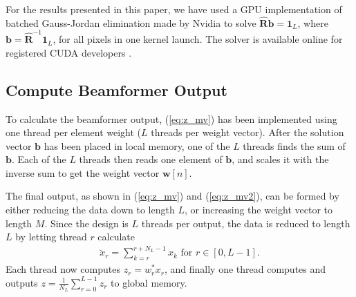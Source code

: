 \documentclass[journal]{IEEEtran}
\newcommand{\mat}[1]{\mathbf{#1}}
\renewcommand{\vec}[1]{\mathbf{#1}}
\begin{document}
For the results presented in this paper, we have used a GPU implementation of batched Gauss-Jordan elimination made by Nvidia to solve $\mat{\hat{R}}\vec{b} = \vec{1}_L$, where $\vec{b} = \mat{\hat{R}}^{-1}\vec{1}_L$, for all pixels in one kernel launch. The solver is available online for registered CUDA developers \cite{Nvidiaa}.%





\subsection{Compute Beamformer Output}
To calculate the beamformer output, (\ref{eq:z_mv}) has been implemented using one thread per element weight ($L$ threads per weight vector). After the solution vector $\vec{b}$ has been placed in local memory, one of the $L$ threads finds the sum of $\vec{b}$. 
Each of the $L$ threads then reads one element of $\vec{b}$, and scales it with the inverse sum to get the weight vector $\vec{w}[n]$. 

The final output, as shown in (\ref{eq:z_mv}) and (\ref{eq:z_mv2}), can be formed by either reducing the data down to length $L$, or increasing the weight vector to length $M$. Since the design is $L$ threads per output, the data is reduced to length $L$ by letting thread $r$ calculate 
\begin{align}\label{eq:subsum}
\breve{x}_{r} = \sum_{k=r}^{r+N_L-1}x_{k} \text{ for } r \in [0, L-1].
\end{align}
Each thread now computes $z_r = w_r^*x_r$, and finally one thread computes and outputs $z = \frac{1}{N_L}\sum_{r=0}^{L-1} z_r$ to global memory. %
\end{document}
